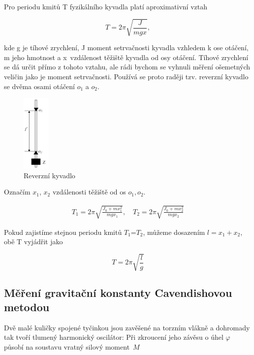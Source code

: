 \documentclass[a4paper,11pt]{article}
\begin{document}
Pro periodu kmitů T fyzikálního kyvadla platí aproximativní vztah

\begin{equation}
T = 2\pi \sqrt{\frac{J}{mgx}},
\end{equation}

\noindent
kde g je tíhové zrychlení, J moment setrvačnosti kyvadla vzhledem k ose otáčení, m jeho hmotnost a x~vzdálenost těžiště kyvadla od osy otáčení. Tíhové zrychlení se dá určit přímo z tohoto vztahu, ale rádi bychom se vyhnuli měření ošemetných veličin jako je moment setrvačnosti. Používá se proto raději tzv. reverzní kyvadlo se dvěma osami otáčení $o_1$ a $o_2$.

\begin{figure}[htpb]
  \centering
  \includegraphics[width=0.12\textwidth]{reverzni_kyvadlo.jpg}
  \caption{Reverzní kyvadlo}
\end{figure}

Označím $x_1$, $x_2$ vzdálenosti těžiště od os $o_1, o_2$.

\begin{align}
  T_1 = 2\pi \sqrt{\frac{J_0+mx_1^2}{mgx_1}}, \quad T_2 = 2\pi \sqrt{\frac{J_0 + mx_2^2}{mgx_2}} 
\end{align}

Pokud zajistíme stejnou periodu kmitů $T_1$=$T_2$, můžeme dosazením $l = x_1 + x_2$, obě T vyjádřit jako

\begin{equation}
T = 2 \pi \sqrt{\frac{l}{g}} 
\end{equation}

\subsection{Měření gravitační konstanty Cavendishovou metodou}

Dvě malé kuličky spojené tyčinkou jsou zavěšené na torzním vlákně a dohromady tak tvoří tlumený harmonický oscilátor: Při zkroucení jeho závěsu o úhel $\varphi$ působí na soustavu vratný silový moment~$M$
\end{document}
